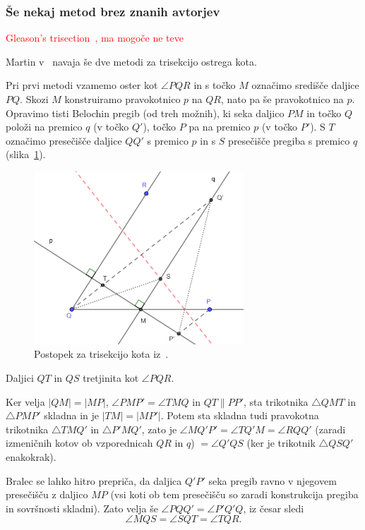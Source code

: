 \subsubsection*{Še nekaj metod brez znanih avtorjev}

\textcolor{red}{Gleason's trisection~\cite{gleason1988}, ma mogoče ne teve}

Martin v~\cite[poglavje 10]{geometricconstructions} navaja še dve metodi za trisekcijo ostrega kota.

Pri prvi metodi vzamemo oster kot $\angle PQR$ in s točko $M$ označimo središče daljice $PQ$. Skozi $M$ konstruiramo pravokotnico $p$ na $QR$, nato pa še pravokotnico na $p$. Opravimo tisti Belochin pregib (od treh možnih), ki seka daljico $PM$ in točko $Q$ položi na premico $q$ (v točko $Q'$), točko $P$ pa na premico $p$ (v točko $P'$). S $T$ označimo presečišče daljice $QQ'$ s premico $p$ in s $S$ presečišče pregiba s premico $q$ (slika~\ref{fig:trisection_10.4}).

\begin{figure}[h]
    \centering
    \includegraphics[width=0.7\textwidth]{images/starogr_problemi/trisection_10.4.png}
    \caption[Trisekcija ostrega kota]{Postopek za trisekcijo kota iz~\cite[str.\ 154]{geometricconstructions}.}
    \label{fig:trisection_10.4}
\end{figure}

\begin{trditev}
    Daljici $QT$ in $QS$ tretjinita kot $\angle PQR$.
\end{trditev}
\begin{dokaz}
    Ker velja $|QM| = |MP|$, $\angle PMP' = \angle TMQ$ in $QT \parallel PP'$, sta trikotnika $\triangle QMT$ in $\triangle PMP'$ skladna in je $|TM| = |MP'|$. Potem sta skladna tudi pravokotna trikotnika $\triangle TMQ'$ in $\triangle P'MQ'$, zato je $\angle MQ'P' = \angle TQ'M = \angle RQQ'$ (zaradi izmeničnih kotov ob vzporednicah $QR$ in $q$) $= \angle Q'QS$ (ker je trikotnik $\triangle QSQ'$ enakokrak).
    
    Bralec se lahko hitro prepriča, da daljica $Q'P'$ seka pregib ravno v njegovem presečišču z daljico $MP$ (vsi koti ob tem presečišču so zaradi konstrukcija pregiba in sovršnosti skladni). Zato velja še $\angle PQQ' = \angle P'Q'Q$, iz česar sledi
    $$ \angle MQS = \angle SQT = \angle TQR.$$
\end{dokaz}


